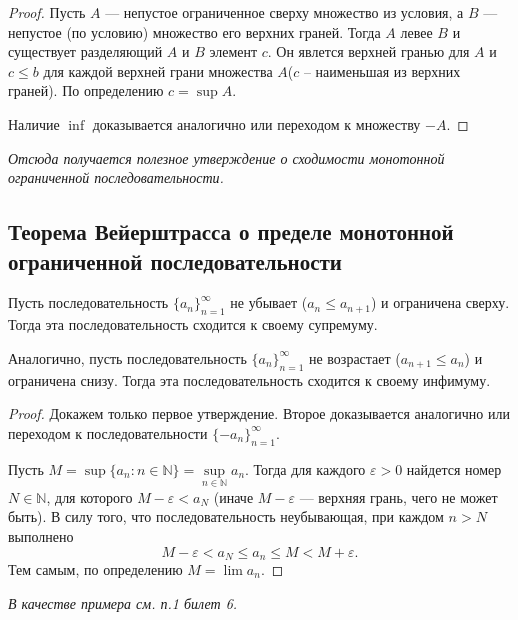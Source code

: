 \documentclass[12pt]{article}
\theoremstyle{definition}
\begin{document}
\begin{proof}
Пусть $A$ --- непустое ограниченное сверху множество из условия,
а $B$ --- непустое (по условию) множество его верхних граней.
Тогда $A$ левее $B$ и существует разделяющий $A$ и $B$ элемент $c$.
Он явлется верхней гранью для $A$ и $c\le b$ для каждой верхней грани множества $A$($c$ -- наименьшая из верхних граней).
По определению $c=\sup A$.

Наличие $\inf$ доказывается аналогично или переходом к множеству $-A$.
\end{proof}
\textit{
Отсюда получается полезное утверждение о сходимости монотонной ограниченной последовательности.}
\subsection{Теорема Вейерштрасса о пределе монотонной ограниченной последовательности} 
Пусть последовательность $\{a_n\}_{n=1}^\infty$ не убывает ($a_n\le a_{n+1}$)
и ограничена сверху. Тогда эта последовательность сходится к своему супремуму.

Аналогично, пусть последовательность $\{a_n\}_{n=1}^\infty$ не возрастает ($a_{n+1}\le a_n$)
и ограничена снизу. Тогда эта последовательность сходится к своему инфимуму.

\begin{proof}
Докажем только первое утверждение.
Второе доказывается аналогично или переходом к последовательности $\{-a_n\}_{n=1}^\infty$.

Пусть $M=\sup\{a_n\colon n\in \mathbb{N}\} = \sup\limits_{n\in \mathbb{N}}a_n$.
Тогда для каждого $\varepsilon>0$ найдется номер $N\in \mathbb{N}$, для которого
$M-\varepsilon< a_N$ (иначе $M-\varepsilon$ --- верхняя грань, чего не может быть).
В силу того, что последовательность неубывающая, при каждом $n>N$ выполнено
$$M-\varepsilon< a_N\le a_n\le M< M+\varepsilon.$$
Тем самым, по определению $M=\lim a_n$.
\end{proof}
\textit{В качестве примера см. п.1 билет 6.}
\end{document}
